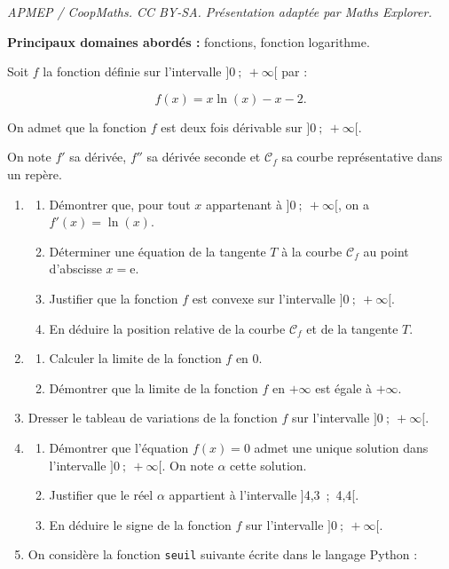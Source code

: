 \documentclass[10pt]{article}
\begin{document}
\noindent\textit{APMEP / CoopMaths. CC BY-SA. Présentation adaptée par Maths Explorer.}\par\medskip
\textbf{Principaux domaines abordés :} fonctions, fonction logarithme.

\medskip

Soit $f$ la fonction définie sur l'intervalle $]0~;~+\infty[$ par :

\[f(x) = x \ln (x) - x - 2.\]

On admet que la fonction $f$ est deux fois dérivable sur $]0~;~+\infty[$.

On note $f'$ sa dérivée, $f''$ sa dérivée seconde et $\mathcal{C}_f$ sa courbe représentative dans un repère.

\medskip

\begin{enumerate}
\item 
	\begin{enumerate}
		\item Démontrer que, pour tout $x$ appartenant à $]0~;~+\infty[$, on a $f'(x) = \ln (x)$.
		\item Déterminer une équation de la tangente $T$ à la courbe $\mathcal{C}_f$ au point
d'abscisse $x = $e.
		\item Justifier que la fonction $f$ est convexe sur l'intervalle $]0~;~+\infty[$.
		\item En déduire la position relative de la courbe $\mathcal{C}_f$ et de la tangente $T$.
	\end{enumerate}	
\item 
	\begin{enumerate}
		\item Calculer la limite de la fonction $f$ en $0$.
		\item Démontrer que la limite de la fonction $f$ en $+\infty$ est égale à $+\infty$.
	\end{enumerate}
\item Dresser le tableau de variations de la fonction $f$ sur l'intervalle $]0~;~+\infty[$.
\item 
	\begin{enumerate}
		\item Démontrer que l'équation $f(x) = 0$ admet une unique solution dans
l'intervalle $]0~;~+\infty[$. On note $\alpha$ cette solution.
		\item Justifier que le réel $\alpha$ appartient à l'intervalle ]4,3~;~4,4[.
		\item En déduire le signe de la fonction $f$ sur l'intervalle $]0~;~+\infty[$.
	\end{enumerate}	
\item On considère la fonction \texttt{seuil} suivante écrite dans le langage Python :


\end{enumerate}
\end{document}
